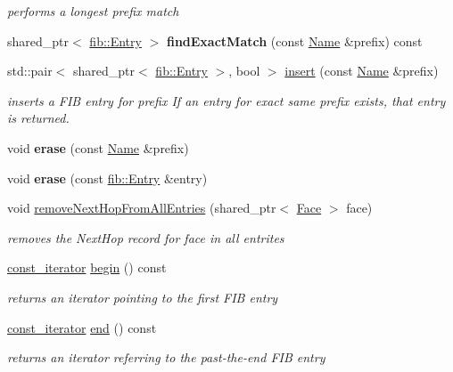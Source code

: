\begin{DoxyCompactItemize}
\begin{DoxyCompactList}\small\item\em performs a longest prefix match \end{DoxyCompactList}\item 
shared\+\_\+ptr$<$ \hyperlink{classnfd_1_1fib_1_1Entry}{fib\+::\+Entry} $>$ {\bfseries find\+Exact\+Match} (const \hyperlink{classndn_1_1Name}{Name} \&prefix) const\hypertarget{classnfd_1_1Fib_a88f5d7c6690190fa81ea5315cf98fa31}{}\label{classnfd_1_1Fib_a88f5d7c6690190fa81ea5315cf98fa31}

\item 
std\+::pair$<$ shared\+\_\+ptr$<$ \hyperlink{classnfd_1_1fib_1_1Entry}{fib\+::\+Entry} $>$, bool $>$ \hyperlink{classnfd_1_1Fib_a1e208bef265495cd9bab55e17e80045a}{insert} (const \hyperlink{classndn_1_1Name}{Name} \&prefix)
\begin{DoxyCompactList}\small\item\em inserts a F\+IB entry for prefix If an entry for exact same prefix exists, that entry is returned. \end{DoxyCompactList}\item 
void {\bfseries erase} (const \hyperlink{classndn_1_1Name}{Name} \&prefix)\hypertarget{classnfd_1_1Fib_a0356aa509016ea589ae519bdfaaf0786}{}\label{classnfd_1_1Fib_a0356aa509016ea589ae519bdfaaf0786}

\item 
void {\bfseries erase} (const \hyperlink{classnfd_1_1fib_1_1Entry}{fib\+::\+Entry} \&entry)\hypertarget{classnfd_1_1Fib_abff4d733b3f681ab819fa35e48a4e9bb}{}\label{classnfd_1_1Fib_abff4d733b3f681ab819fa35e48a4e9bb}

\item 
void \hyperlink{classnfd_1_1Fib_a272b675df2961dd1ab3ea3cbb2e87810}{remove\+Next\+Hop\+From\+All\+Entries} (shared\+\_\+ptr$<$ \hyperlink{classnfd_1_1Face}{Face} $>$ face)
\begin{DoxyCompactList}\small\item\em removes the Next\+Hop record for face in all entrites \end{DoxyCompactList}\item 
\hyperlink{classnfd_1_1Fib_1_1const__iterator}{const\+\_\+iterator} \hyperlink{classnfd_1_1Fib_ae50d2c9a662b44f029d6a14f9e43a5cc}{begin} () const
\begin{DoxyCompactList}\small\item\em returns an iterator pointing to the first F\+IB entry \end{DoxyCompactList}\item 
\hyperlink{classnfd_1_1Fib_1_1const__iterator}{const\+\_\+iterator} \hyperlink{classnfd_1_1Fib_add14e734eb70e1ab3fe2fabf9526a963}{end} () const
\begin{DoxyCompactList}\small\item\em returns an iterator referring to the past-\/the-\/end F\+IB entry \end{DoxyCompactList}\end{DoxyCompactItemize}


